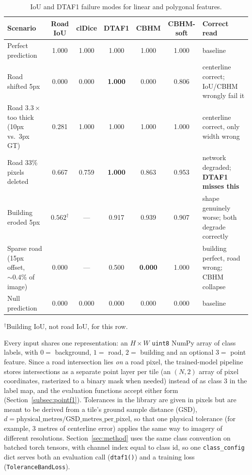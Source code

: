 \begin{table}
  \caption{IoU and DTAF1 failure modes for linear and polygonal features.}
  \label{tab:failure-modes}
  \begin{tabular}{@{}>{\raggedright\arraybackslash}p{3.9cm}ccccc>{\raggedright\arraybackslash}p{4.4cm}@{}}
    \toprule
    Scenario & Road IoU & clDice & DTAF1 & CBHM & CBHM-soft & Correct read \\
    \midrule
    Perfect prediction & 1.000 & 1.000 & 1.000 & 1.000 & 1.000 & baseline \\
    Road shifted 5px & 0.000 & 0.000 & \textbf{1.000} & 0.000 & 0.806 &
      centerline correct; IoU/CBHM wrongly fail it \\
    Road $3.3\times$ too thick (10px vs.\ 3px GT) & 0.281 & 1.000 & 1.000 & 1.000 & 1.000 &
      centerline correct, only width wrong \\
    Road 33\% pixels deleted & 0.667 & 0.759 & \textbf{1.000} & 0.863 & 0.953 &
      network degraded; \textbf{DTAF1 misses this} \\
    Building eroded 5px & $0.562^\dagger$ & --- & 0.917 & 0.939 & 0.907 &
      shape genuinely worse; both degrade correctly \\
    Sparse road (15px offset, ${\sim}0.4\%$ of image) & 0.000 & --- & 0.500 & \textbf{0.000} & 1.000 &
      building perfect, road wrong; CBHM collapse \\
    Null prediction & 0.000 & 0.000 & 0.000 & 0.000 & 0.000 & baseline \\
    \bottomrule
  \end{tabular}
  \par\vspace{2pt}
  {\footnotesize $^\dagger$Building IoU, not road IoU, for this row.\par}
\end{table}

Every input shares one representation: an $H\times W$ \texttt{uint8} NumPy array of class labels,
with $0=$ background, $1=$ road, $2=$ building and an optional $3=$ point feature. Since a road
intersection lies \emph{on} a road pixel, the trained-model pipeline stores intersections as a
separate point layer per tile (an $(N,2)$ array of pixel coordinates, rasterized to a binary mask
when needed) instead of as class 3 in the label map, and the evaluation functions accept either
form (Section~\ref{subsec:pointf1}). Tolerances in the library are given in pixels but are meant to
be derived from a tile's ground sample distance (GSD), $d = \text{physical\_metres} /
\text{GSD\_metres\_per\_pixel}$, so that one physical tolerance (for example, 3 metres of
centerline error) applies the same way to imagery of different resolutions.
Section~\ref{sec:method} uses the same class convention on batched torch tensors, with channel
index equal to class id, so one \texttt{class\_config} dict serves both an evaluation call
(\texttt{dtaf1()}) and a training loss (\texttt{ToleranceBandLoss}).

